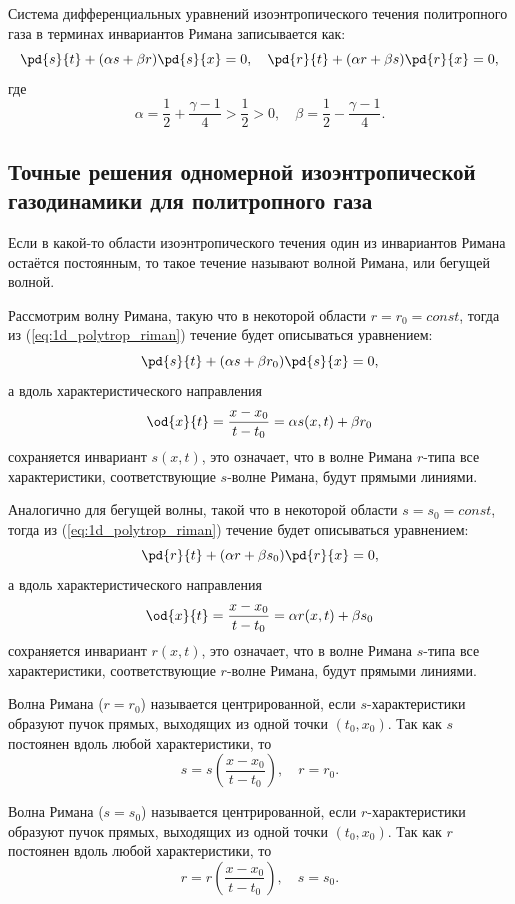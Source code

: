 \documentclass[14pt]{extarticle}
\begin{document}
Система дифференциальных уравнений изоэнтропического течения политропного газа в терминах инвариантов Римана записывается как:
\begin{equation}
	\label{eq:1d_polytrop_riman}
	\pd{s}{t}+(\alpha s + \beta r)\pd{s}{x} = 0,\quad
	\pd{r}{t}+(\alpha r + \beta s)\pd{r}{x} = 0,
\end{equation}
где
\[
	\alpha = \frac{1}{2}+\frac{\gamma-1}{4}>\frac{1}{2}>0,\quad
	\beta  = \frac{1}{2}-\frac{\gamma-1}{4}.
\]

\subsection{Точные решения одномерной изоэнтропической газодинамики для политропного газа}

\begin{dfn}
	Если в какой-то области изоэнтропического течения один из инвариантов Римана остаётся постоянным, то такое течение называют \alert{волной Римана}, или \alert{бегущей волной}. 
\end{dfn}

Рассмотрим волну Римана, такую что в некоторой области $r = r_0 = const$, тогда из (\ref{eq:1d_polytrop_riman}) течение будет описываться уравнением:
\[
\pd{s}{t}+(\alpha s + \beta r_0)\pd{s}{x} = 0,
\]	
а вдоль характеристического направления 
\[
\od{x}{t} = \frac{x-x_0}{t-t_0} = \alpha s(x,t) + \beta r_0
\]
сохраняется инвариант $s(x,t)$, это означает, что в волне Римана $r$-типа все характеристики, соответствующие $s$-волне Римана, будут \alert{прямыми линиями}.
	

Аналогично для бегущей волны, такой что в некоторой области $s = s_0 = const$, тогда из (\ref{eq:1d_polytrop_riman}) течение будет описываться уравнением:
\[
\pd{r}{t}+(\alpha r + \beta s_0)\pd{r}{x} = 0,
\]	
а вдоль характеристического направления 
\[
\od{x}{t} = \frac{x-x_0}{t-t_0} = \alpha r(x,t) + \beta s_0
\]
сохраняется инвариант $r(x,t)$, это означает, что в волне Римана $s$-типа все характеристики, соответствующие $r$-волне Римана, будут \alert{прямыми линиями}.

\begin{dfn}
Волна Римана ($r=r_0$) называется \alert{центрированной}, если $s$-ха\-рак\-те\-рис\-тики образуют пучок прямых, выходящих из одной точки $(t_0,x_0)$.
Так как $s$ постоянен вдоль любой характеристики, то 		
\[
	s = s\left(\frac{x-x_0}{t-t_0} \right),\quad r=r_0.
\]			
\end{dfn}
	
\begin{dfn}
Волна Римана ($s=s_0$) называется \alert{центрированной}, если $r$-ха\-рак\-те\-рис\-тики образуют пучок прямых, выходящих из одной точки $(t_0,x_0)$.
Так как $r$ постоянен вдоль любой характеристики, то 
\[
	r = r\left(\frac{x-x_0}{t-t_0} \right),\quad s=s_0.
\]			
\end{dfn}
	
\end{document}
